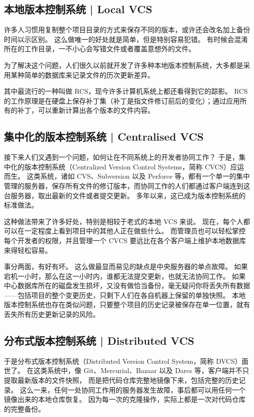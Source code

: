 \documentclass{nle}
\begin{document}
\subsection{本地版本控制系统 | Local VCS}

许多人习惯用复制整个项目目录的方式来保存不同的版本，或许还会改名加上备份时间以示区别。 这么做唯一的好处就是简单，但是特别容易犯错。 有时候会混淆所在的工作目录，一不小心会写错文件或者覆盖意想外的文件。

为了解决这个问题，人们很久以前就开发了许多种本地版本控制系统，大多都是采用某种简单的数据库来记录文件的历次更新差异。

其中最流行的一种叫做 RCS，现今许多计算机系统上都还看得到它的踪影。 RCS 的工作原理是在硬盘上保存补丁集（补丁是指文件修订前后的变化）；通过应用所有的补丁，可以重新计算出各个版本的文件内容。

\subsection{集中化的版本控制系统 | Centralised VCS}

接下来人们又遇到一个问题，如何让在不同系统上的开发者协同工作？ 于是，集中化的版本控制系统（Centralized Version Control Systems，简称 CVCS）应运而生。 这类系统，诸如 CVS、Subversion 以及 Perforce 等，都有一个单一的集中管理的服务器，保存所有文件的修订版本，而协同工作的人们都通过客户端连到这台服务器，取出最新的文件或者提交更新。 多年以来，这已成为版本控制系统的标准做法。

这种做法带来了许多好处，特别是相较于老式的本地 VCS 来说。 现在，每个人都可以在一定程度上看到项目中的其他人正在做些什么。 而管理员也可以轻松掌控每个开发者的权限，并且管理一个 CVCS 要远比在各个客户端上维护本地数据库来得轻松容易。

事分两面，有好有坏。 这么做最显而易见的缺点是中央服务器的单点故障。 如果宕机一小时，那么在这一小时内，谁都无法提交更新，也就无法协同工作。 如果中心数据库所在的磁盘发生损坏，又没有做恰当备份，毫无疑问你将丢失所有数据——包括项目的整个变更历史，只剩下人们在各自机器上保留的单独快照。 本地版本控制系统也存在类似问题，只要整个项目的历史记录被保存在单一位置，就有丢失所有历史更新记录的风险。

\subsection{分布式版本控制系统 | Distributed VCS}

于是分布式版本控制系统（Distributed Version Control System，简称 DVCS）面世了。 在这类系统中，像 Git、Mercurial、Bazaar 以及 Darcs 等，客户端并不只提取最新版本的文件快照， 而是把代码仓库完整地镜像下来，包括完整的历史记录。 这么一来，任何一处协同工作用的服务器发生故障，事后都可以用任何一个镜像出来的本地仓库恢复。 因为每一次的克隆操作，实际上都是一次对代码仓库的完整备份。
\end{document}
